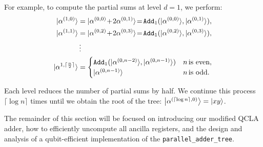 \documentclass[reprint,amsmath,amssymb,aps,pra]{revtex4-2}
\newcommand{\smallket}[1]{{|{#1}\rangle}}
\begin{document}
For example, to compute the partial sums at level ${d=1}$, we perform:
\begin{align}
    \smallket{\alpha^{(1,0)}} &= \smallket{\alpha^{(0,0)}\!+\!2\alpha^{(0,1)}}\!=\!\texttt{Add}_1(\smallket{\alpha^{(0,0)}},\smallket{\alpha^{(0,1)}}),\\
    \smallket{\alpha^{(1,1)}} &= \smallket{\alpha^{(0,2)}\!+\!2\alpha^{(0,3)}}\!=\!\texttt{Add}_1(\smallket{\alpha^{(0,2)}},\smallket{\alpha^{(0,3)}}),\\
    &\vdots \notag\\
    \smallket{\alpha^{1,\lceil \frac{n}{2}\rceil}} 
    &= %
    \begin{cases}
    \texttt{Add}_1(\smallket{\alpha^{(0,n-2)}},\smallket{\alpha^{(0,n-1)}}) & n \, \text{is even},\\
    \smallket{\alpha^{(0,n-1)}} & n \, \text{is odd}.
    \end{cases}
\end{align}


Each level reduces the number of partial sums by half. %
We continue this process $\lceil \log{n}\rceil$ times until we obtain the root of the tree:
$\ket{\alpha^{(\lceil\log{n}\rceil,0)}}=\ket{xy}$.

The remainder of this section will be focused on introducing our modified QCLA adder, how to efficiently uncompute all ancilla registers, and the design and analysis of a qubit-efficient implementation of the \texttt{parallel\_adder\_tree}.
\end{document}
